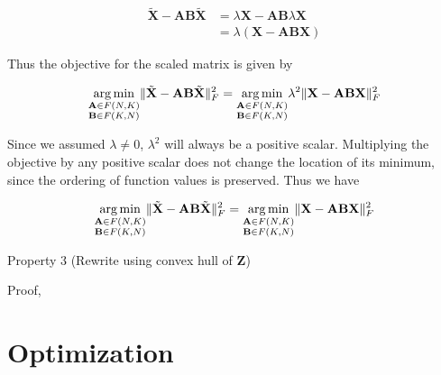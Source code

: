 \documentclass[oneside]{article}
\begin{document}
\begin{equation}
    \begin{aligned}
    \tilde{\mathbf{X}} - \mathbf{A} \mathbf{B} \tilde{\mathbf{X}} 
    &= \lambda \mathbf{X} - \mathbf{A} \mathbf{B} \lambda \mathbf{X} \\
    &= \lambda \left( \mathbf{X} - \mathbf{A} \mathbf{B} \mathbf{X} \right)
    \end{aligned}
\end{equation}

Thus the objective for the scaled matrix is given by

\begin{equation}
    \underset{\begin{subarray}{c} \mathbf{A} \in F(N, K) \\ \mathbf{B} \in F(K, N) \end{subarray}}{\arg \min} \| \tilde{\mathbf{X}} - \mathbf{A} \mathbf{B} \tilde{\mathbf{X}} \|_F^2 = \underset{\begin{subarray}{c} \mathbf{A} \in F(N, K) \\ \mathbf{B} \in F(K, N) \end{subarray}}{\arg \min} \lambda^2 \| \mathbf{X} - \mathbf{A} \mathbf{B} \mathbf{X} \|_F^2
\end{equation}

Since we assumed $\lambda \neq 0$, $\lambda^2$ will always be a positive scalar. Multiplying the objective by any positive scalar does not change the location of its minimum, since the ordering of function values is preserved. Thus we have

\begin{equation}
    \underset{\begin{subarray}{c} \mathbf{A} \in F(N, K) \\ \mathbf{B} \in F(K, N) \end{subarray}}{\arg \min} \| \tilde{\mathbf{X}} - \mathbf{A} \mathbf{B} \tilde{\mathbf{X}} \|_F^2 = \underset{\begin{subarray}{c} \mathbf{A} \in F(N, K) \\ \mathbf{B} \in F(K, N) \end{subarray}}{\arg \min} \| \mathbf{X} - \mathbf{A} \mathbf{B} \mathbf{X} \|_F^2
\end{equation}


Property 3 (Rewrite using convex hull of $\mathbf{Z}$)

Proof, 

\section{Optimization}
\end{document}
